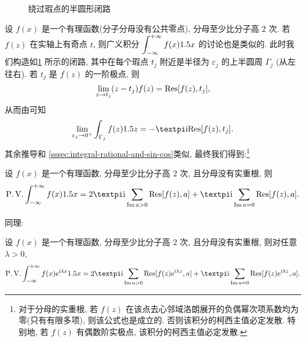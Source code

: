 \begin{figure}[H]
\begin{minipage}{.48\textwidth}
    \caption{绕过瑕点的半圆形闭路}
    \label{fig:half-circle-remove-singular-contour}
  \end{minipage}
\end{figure}

设 $f(x)$ 是一个有理函数(分子分母没有公共零点), 分母至少比分子高 $2$ 次.
若 $f(z)$ 在实轴上有奇点 $t$, 则广义积分 $\displaystyle\int_{-\infty}^{+\infty} f(x)1.5 x$ 的讨论也是类似的.
此时我们构造如\ref{fig:half-circle-remove-singular-contour} 所示的闭路, 其中在每个瑕点 $t_j$ 附近是半径为 $\varepsilon_j$ 的上半圆周 $\Gamma_j$ (从左往右).
若 $t_j$ 是 $f(z)$ 的一阶极点, 则
\[
  \lim_{z\rightarrow t_j} (z-t_j)f(z)={\mathrm{Res}}[f(z),t_j],
\]
从而由\thmsa 可知
\[
  \lim_{\varepsilon_j\ra 0^+}\int_{\Gamma_j}f(z)\d z
  =-\cpi\ii\Res[f(z),t_j].
\]
其余推导和 \ref{sssec:integral-rational-and-sin-cos}类似, 最终我们得到:\footnote{
  对于分母的实重根, 若 $f(z)$ 在该点去心邻域洛朗展开的负偶幂次项系数均为零(只有有限多项), 则该公式也是成立的.
  否则该积分的柯西主值必定发散.
  特别地, 若 $f(z)$ 有偶数阶实极点, 该积分的柯西主值必定发散.
}

\begin{theorem}
  设 $f(x)$ 是一个有理函数, 分母至少比分子高 $2$ 次, 且分母没有实重根, 则
  \[
     \PV\intff f(x)\d x
    =2\cpi\ii\sum_{\Im a>0}\Res[f(z),a]
    +\cpi\ii\sum_{\Im a=0}\Res[f(z),a].
  \]
\end{theorem}
同理:
\begin{theorem}
  设 $f(x)$ 是一个有理函数, 分母至少比分子高 $2$ 次, 且分母没有实重根, 则对任意 $\lambda>0$,
  \[
     \PV\intff f(x)\ee^{\ii \lambda x}\d x
    =2\cpi\ii\sum_{\Im a>0}\Res[f(z)\ee^{\ii \lambda z},a]
    +\cpi\ii\sum_{\Im a=0}\Res[f(z)\ee^{\ii \lambda z},a].
  \]
\end{theorem}



